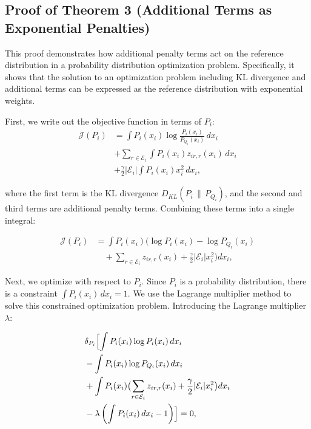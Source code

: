 \documentclass[a4paper,fleqn,10pt,twocolumn]{SICE_ISCS}
\begin{document}
\subsection{Proof of Theorem 3 (Additional Terms as Exponential Penalties)}
This proof demonstrates how additional penalty terms act on the reference distribution in a probability distribution optimization problem. Specifically, it shows that the solution to an optimization problem including KL divergence and additional terms can be expressed as the reference distribution with exponential weights.

First, we write out the objective function in terms of $P_i$:
\begin{equation}
\begin{aligned}
{\mathcal{J}}(P_i) &= \int P_i(x_i)\log\frac{P_i(x_i)}{P_{Q_i}(x_i)}\,dx_i \\
&+ \sum_{r \in {\mathcal{E}}_i}\int P_i(x_i) z_{ir,r}(x_i)\,dx_i  \\
&+ \frac{\gamma}{2}|{\mathcal{E}}_i| \int P_i(x_i) x_i^2\, dx_i,
\end{aligned}
\end{equation}

where the first term is the KL divergence $D_{KL}(P_i \,\|\, P_{Q_i})$, and the second and third terms are additional penalty terms. Combining these terms into a single integral:

\begin{equation}
\begin{aligned}
{\mathcal{J}}(P_i) &= \int P_i(x_i)\biggl(\log P_i(x_i) - \log P_{Q_i}(x_i) \\
&\quad + \sum_{r \in {\mathcal{E}}_i} z_{ir,r}(x_i)
+ \frac{\gamma}{2}|{\mathcal{E}}_i| x_i^2 \biggr) dx_i,
\end{aligned}
\end{equation}

Next, we optimize with respect to $P_i$. Since $P_i$ is a probability distribution, there is a constraint $\int P_i(x_i)\,dx_i=1$. We use the Lagrange multiplier method to solve this constrained optimization problem. Introducing the Lagrange multiplier $\lambda$:

\begin{equation}
\begin{aligned}
&\delta_{P_i}\Bigl[\int P_i(x_i)\log P_i(x_i)\,dx_i\\
&- \int P_i(x_i)\log P_{Q_i}(x_i)\,dx_i\\
&+ \int P_i(x_i)\bigl(\sum_{r \in {\mathcal{E}}_i} z_{ir,r}(x_i)+ \frac{\gamma}{2}|{\mathcal{E}}_i|x_i^2\bigr)dx_i\\
&- \lambda \left(\int P_i(x_i)\,dx_i -1\right)\Bigr]= 0,
\end{aligned}
\end{equation}
\end{document}
